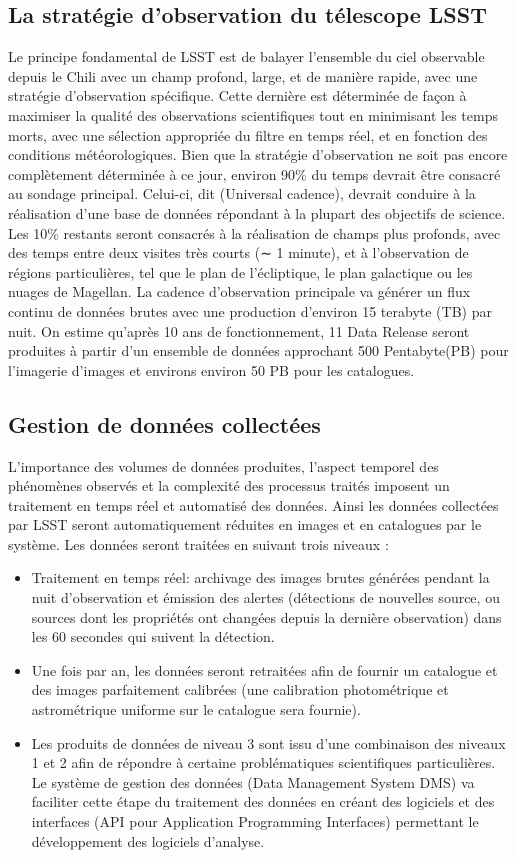 \subsection{La stratégie d'observation du télescope LSST}
Le principe fondamental de LSST est de balayer l'ensemble du ciel observable depuis le Chili avec un champ profond, large, et de manière rapide, avec une stratégie d'observation spécifique. Cette dernière est déterminée de façon à maximiser la qualité des observations scientifiques tout en minimisant les temps morts, avec une sélection appropriée du filtre en temps réel, et en fonction des conditions météorologiques. Bien que la stratégie d'observation ne soit pas encore complètement déterminée à ce jour, environ 90\% du temps devrait être consacré au sondage principal. Celui-ci, dit (Universal cadence), devrait conduire à la réalisation d’une base de données répondant à la plupart des objectifs de science.  Les 10\% restants seront consacrés à la réalisation de champs plus profonds, avec des temps entre deux visites très courts (∼ 1 minute), et à l'observation de régions particulières, tel que le plan de l'écliptique, le plan galactique ou les nuages de Magellan.
La cadence d'observation principale va générer un flux continu de données brutes avec une production d'environ 15 terabyte (TB) par nuit. On estime qu'après 10 ans de fonctionnement, 11 Data Release seront produites à partir d'un ensemble de données approchant 500 Pentabyte(PB) pour l'imagerie d'images et environs environ 50 PB pour les catalogues.
\subsection{Gestion de données collectées}
L'importance des volumes de données produites, l'aspect temporel des phénomènes observés et la complexité des processus traités imposent un traitement en temps réel et automatisé des données. Ainsi les données collectées par LSST seront automatiquement réduites en images et en catalogues par le système. Les données seront traitées en suivant trois niveaux :
\begin{itemize}
    \item Traitement en temps réel: archivage des images brutes générées pendant la nuit d'observation et émission des alertes (détections de nouvelles source, ou sources dont les propriétés ont changées depuis la dernière observation) dans les 60 secondes qui suivent la détection.
    \item Une fois par an, les données seront retraitées afin de fournir un catalogue et des images parfaitement calibrées (une calibration photométrique et astrométrique uniforme sur le catalogue sera fournie).
    \item Les produits de données de niveau 3 sont issu d'une combinaison des niveaux 1 et 2 afin de répondre à certaine problématiques scientifiques particulières. Le système de gestion des données (Data Management System DMS) va faciliter cette étape du traitement des données en créant des logiciels et des interfaces (API pour Application Programming Interfaces) permettant le développement des logiciels d'analyse.
\end{itemize}

